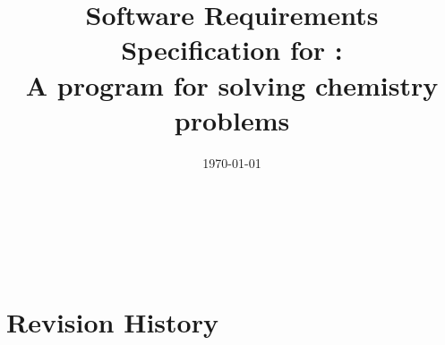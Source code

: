 \documentclass[12pt]{article}
\begin{document}
\title{Software Requirements Specification for \progname:\\
  A program for solving chemistry problems}
\author{\authname}
\date{\today}

\maketitle
\thispagestyle{empty}

~\newpage


\tableofcontents

~\newpage

\section{Revision History} \label{sec_revHist}
\end{document}

